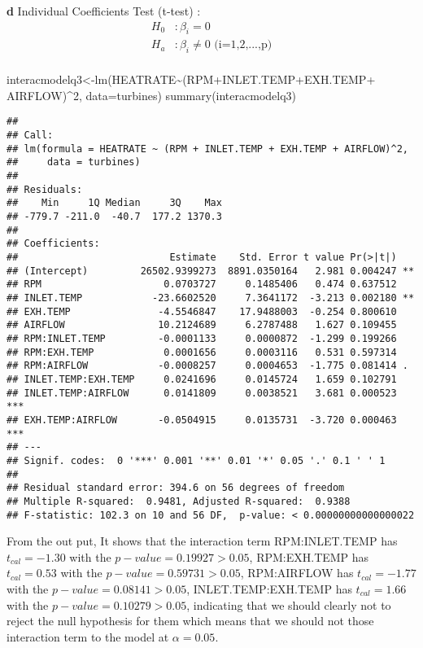 \documentclass[
]{article}
\newenvironment{Shaded}{\begin{snugshade}}{\end{snugshade}}
\newcommand{\AttributeTok}[1]{\textcolor[rgb]{0.77,0.63,0.00}{#1}}
\newcommand{\DecValTok}[1]{\textcolor[rgb]{0.00,0.00,0.81}{#1}}
\newcommand{\FunctionTok}[1]{\textcolor[rgb]{0.00,0.00,0.00}{#1}}
\newcommand{\NormalTok}[1]{#1}
\newcommand{\OtherTok}[1]{\textcolor[rgb]{0.56,0.35,0.01}{#1}}
\newcommand{\SpecialCharTok}[1]{\textcolor[rgb]{0.00,0.00,0.00}{#1}}
\begin{document}
\textbf{d} Individual Coefficients Test (t-test) : \[
\begin{aligned}
H_0&:\beta_i=0\\
H_a&:\beta_i\neq0\mbox{    (i=1,2,...,p)}\\
\end{aligned}
\]

\begin{Shaded}
\begin{Highlighting}[]
\NormalTok{interacmodelq3}\OtherTok{\textless{}{-}}\FunctionTok{lm}\NormalTok{(HEATRATE}\SpecialCharTok{\textasciitilde{}}\NormalTok{(RPM}\SpecialCharTok{+}\NormalTok{INLET.TEMP}\SpecialCharTok{+}\NormalTok{EXH.TEMP}\SpecialCharTok{+}\NormalTok{ AIRFLOW)}\SpecialCharTok{\^{}}\DecValTok{2}\NormalTok{, }\AttributeTok{data=}\NormalTok{turbines)}
\FunctionTok{summary}\NormalTok{(interacmodelq3)}
\end{Highlighting}
\end{Shaded}

\begin{verbatim}
## 
## Call:
## lm(formula = HEATRATE ~ (RPM + INLET.TEMP + EXH.TEMP + AIRFLOW)^2, 
##     data = turbines)
## 
## Residuals:
##    Min     1Q Median     3Q    Max 
## -779.7 -211.0  -40.7  177.2 1370.3 
## 
## Coefficients:
##                          Estimate    Std. Error t value Pr(>|t|)    
## (Intercept)         26502.9399273  8891.0350164   2.981 0.004247 ** 
## RPM                     0.0703727     0.1485406   0.474 0.637512    
## INLET.TEMP            -23.6602520     7.3641172  -3.213 0.002180 ** 
## EXH.TEMP               -4.5546847    17.9488003  -0.254 0.800610    
## AIRFLOW                10.2124689     6.2787488   1.627 0.109455    
## RPM:INLET.TEMP         -0.0001133     0.0000872  -1.299 0.199266    
## RPM:EXH.TEMP            0.0001656     0.0003116   0.531 0.597314    
## RPM:AIRFLOW            -0.0008257     0.0004653  -1.775 0.081414 .  
## INLET.TEMP:EXH.TEMP     0.0241696     0.0145724   1.659 0.102791    
## INLET.TEMP:AIRFLOW      0.0141809     0.0038521   3.681 0.000523 ***
## EXH.TEMP:AIRFLOW       -0.0504915     0.0135731  -3.720 0.000463 ***
## ---
## Signif. codes:  0 '***' 0.001 '**' 0.01 '*' 0.05 '.' 0.1 ' ' 1
## 
## Residual standard error: 394.6 on 56 degrees of freedom
## Multiple R-squared:  0.9481, Adjusted R-squared:  0.9388 
## F-statistic: 102.3 on 10 and 56 DF,  p-value: < 0.00000000000000022
\end{verbatim}

From the out put, It shows that the interaction term RPM:INLET.TEMP has
\(t_{cal}=-1.30\) with the \(p-value= 0.19927> 0.05\), RPM:EXH.TEMP has
\(t_{cal}=0.53\) with the \(p-value= 0.59731 > 0.05\), RPM:AIRFLOW has
\(t_{cal}=-1.77\) with the \(p-value= 0.08141 > 0.05\),
INLET.TEMP:EXH.TEMP has \(t_{cal}=1.66\) with the
\(p-value= 0.10279 > 0.05\), indicating that we should clearly not to
reject the null hypothesis for them which means that we should not those
interaction term to the model at \(α=0.05\).
\end{document}
